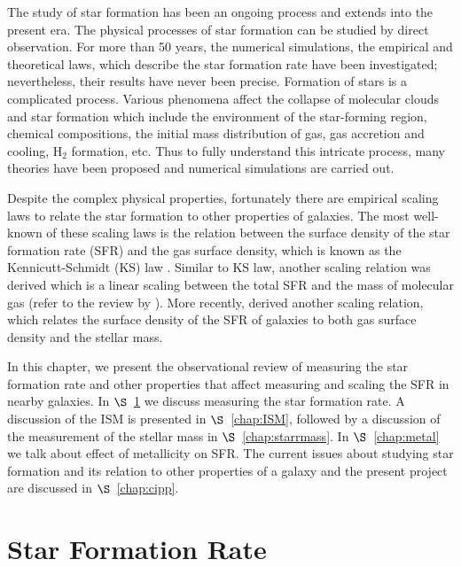   
The study of star formation has been an ongoing process and extends into the present era. The physical processes of star formation can be studied by direct observation. For more than 50 years, the numerical simulations, the empirical and theoretical laws, which describe the star formation rate have been investigated; nevertheless, their results have never been precise. Formation of stars is a complicated process. Various phenomena affect the collapse of molecular clouds and star formation which include the environment of the star-forming region, chemical compositions, the initial mass distribution of gas, gas accretion and cooling, H$_2$ formation, etc. Thus to fully understand this intricate process, many theories have been proposed and numerical simulations are carried out.

Despite the complex physical properties, fortunately there are empirical scaling laws to relate the star formation to other properties of galaxies. The most well-known of these scaling laws is the relation between the surface density of the star formation rate (SFR) and the gas surface density, which is known as the Kennicutt-Schmidt (KS) law \citep{Schmidt59, Kennicutt98a}. Similar to KS law, another scaling relation was derived which is a linear scaling between the total SFR and the mass of molecular gas (refer to the review by \cite{Elmgrenn11}). More recently, \cite{Shi11} derived another scaling relation, which relates the surface density of the SFR of galaxies to both gas surface density and the stellar mass.  

In this chapter, we present the observational review of measuring the star formation rate and other properties that affect measuring and scaling the SFR in nearby galaxies. In $\S$~\ref{chap:sfr} we discuss measuring the star formation rate. A discussion of the ISM is presented in $\S$~\ref{chap:ISM}, followed by a discussion of the measurement of the stellar mass in $\S$~\ref{chap:starrmass}. In $\S$~\ref{chap:metal} we talk about effect of metallicity on SFR. The current issues about studying star formation and its relation to other properties of a galaxy and the present project are discussed in $\S$~\ref{chap:cipp}. 

\section{Star Formation Rate}
\label{chap:sfr}

